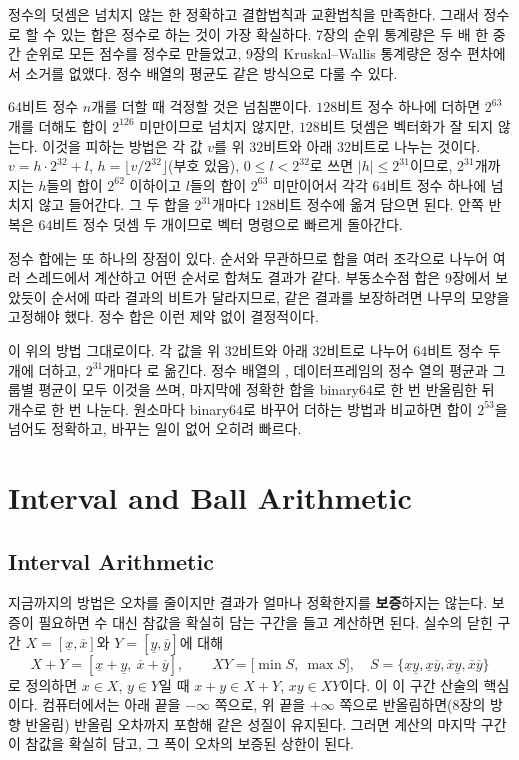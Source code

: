 정수의 덧셈은 넘치지 않는 한 정확하고 결합법칙과 교환법칙을 만족한다. 그래서 정수로 할 수 있는 합은 정수로 하는 것이 가장 확실하다. 7장의 순위 통계량은 두 배 한 중간 순위로 모든 점수를 정수로 만들었고, 9장의 Kruskal--Wallis 통계량은 정수 편차에서 소거를 없앴다. 정수 배열의 평균도 같은 방식으로 다룰 수 있다.

$64$비트 정수 $n$개를 더할 때 걱정할 것은 넘침뿐이다. $128$비트 정수 하나에 더하면 $2^{63}$개를 더해도 합이 $2^{126}$ 미만이므로 넘치지 않지만, $128$비트 덧셈은 벡터화가 잘 되지 않는다. 이것을 피하는 방법은 각 값 $v$를 위 $32$비트와 아래 $32$비트로 나누는 것이다. $v=h\cdot2^{32}+l$, $h=\lfloor v/2^{32}\rfloor$(부호 있음), $0\le l<2^{32}$로 쓰면 $|h|\le2^{31}$이므로, $2^{31}$개까지는 $h$들의 합이 $2^{62}$ 이하이고 $l$들의 합이 $2^{63}$ 미만이어서 각각 $64$비트 정수 하나에 넘치지 않고 들어간다. 그 두 합을 $2^{31}$개마다 $128$비트 정수에 옮겨 담으면 된다. 안쪽 반복은 $64$비트 정수 덧셈 두 개이므로 벡터 명령으로 빠르게 돌아간다.

정수 합에는 또 하나의 장점이 있다. 순서와 무관하므로 합을 여러 조각으로 나누어 여러 스레드에서 계산하고 어떤 순서로 합쳐도 결과가 같다. 부동소수점 합은 9장에서 보았듯이 순서에 따라 결과의 비트가 달라지므로, 같은 결과를 보장하려면 나무의 모양을 고정해야 했다. 정수 합은 이런 제약 없이 결정적이다.

\begin{instardust}
이 위의 방법 그대로이다. 각 값을 위 $32$비트와 아래 $32$비트로 나누어 $64$비트 정수 두 개에 더하고, $2^{31}$개마다 로 옮긴다. 정수 배열의 , 데이터프레임의 정수 열의 평균과 그룹별 평균이 모두 이것을 쓰며, 마지막에 정확한 합을 binary64로 한 번 반올림한 뒤 개수로 한 번 나눈다. 원소마다 binary64로 바꾸어 더하는 방법과 비교하면 합이 $2^{53}$을 넘어도 정확하고, 바꾸는 일이 없어 오히려 빠르다.
\end{instardust}

\section{Interval and Ball Arithmetic}
\label{sec:interval}

\subsection{Interval Arithmetic}

지금까지의 방법은 오차를 줄이지만 결과가 얼마나 정확한지를 \textbf{보증}하지는 않는다. 보증이 필요하면 수 대신 참값을 확실히 담는 구간을 들고 계산하면 된다. 실수의 닫힌 구간 $X=[\underline x,\overline x]$와 $Y=[\underline y,\overline y]$에 대해
\[
X+Y=[\underline x+\underline y,\ \overline x+\overline y],\qquad XY=\bigl[\min S,\ \max S\bigr],\quad S=\{\underline x\underline y,\underline x\overline y,\overline x\underline y,\overline x\overline y\}
\]
로 정의하면 $x\in X$, $y\in Y$일 때 $x+y\in X+Y$, $xy\in XY$이다. 이 이 구간 산술의 핵심이다\cite{moore1966interval}. 컴퓨터에서는 아래 끝을 $-\infty$ 쪽으로, 위 끝을 $+\infty$ 쪽으로 반올림하면(8장의 방향 반올림) 반올림 오차까지 포함해 같은 성질이 유지된다. 그러면 계산의 마지막 구간이 참값을 확실히 담고, 그 폭이 오차의 보증된 상한이 된다.

